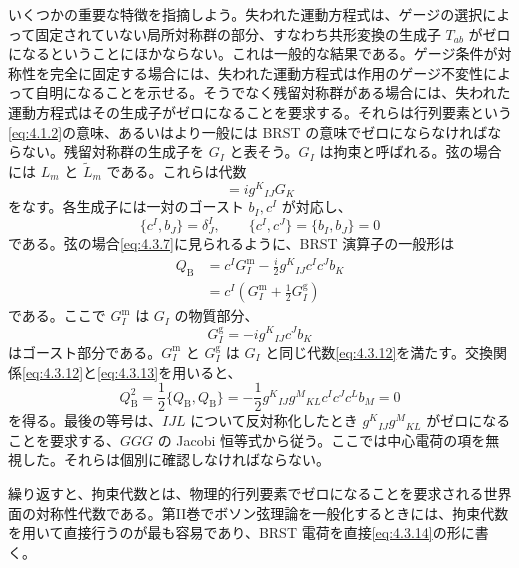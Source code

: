 いくつかの重要な特徴を指摘しよう。失われた運動方程式は、ゲージの選択によって固定されていない局所対称群の部分、すなわち共形変換の生成子 $T_{ab}$ がゼロになるということにほかならない。これは一般的な結果である。ゲージ条件が対称性を完全に固定する場合には、失われた運動方程式は作用のゲージ不変性によって自明になることを示せる。そうでなく残留対称群がある場合には、失われた運動方程式はその生成子がゼロになることを要求する。それらは行列要素という\eqref{eq:4.1.2}の意味、あるいはより一般には BRST の意味でゼロにならなければならない。残留対称群の生成子を $G_I$ と表そう。$G_I$ は拘束と呼ばれる。弦の場合には $L_m$ と $\widetilde L_m$ である。これらは代数
\begin{equation}
[G_I,G_J]=ig^K{}_{IJ}G_K
\tag{4.3.12}\label{eq:4.3.12}
\end{equation}
をなす。各生成子には一対のゴースト $b_I,c^I$ が対応し、
\begin{equation}
\{c^I,b_J\}=\delta^I_J,\qquad
\{c^I,c^J\}=\{b_I,b_J\}=0
\tag{4.3.13}\label{eq:4.3.13}
\end{equation}
である。弦の場合\eqref{eq:4.3.7}に見られるように、BRST 演算子の一般形は
\begin{equation}
\begin{aligned}
Q_{\mathrm B}
&=c^IG^{\mathrm m}_I-\frac i2g^K{}_{IJ}c^Ic^Jb_K\\
&=c^I\left(G^{\mathrm m}_I+\frac12G^{\mathrm g}_I\right)
\end{aligned}
\tag{4.3.14}\label{eq:4.3.14}
\end{equation}
である。ここで $G^{\mathrm m}_I$ は $G_I$ の物質部分、
\begin{equation}
G^{\mathrm g}_I=-ig^K{}_{IJ}c^Jb_K
\tag{4.3.15}\label{eq:4.3.15}
\end{equation}
はゴースト部分である。$G^{\mathrm m}_I$ と $G^{\mathrm g}_I$ は $G_I$ と同じ代数\eqref{eq:4.3.12}を満たす。交換関係\eqref{eq:4.3.12}と\eqref{eq:4.3.13}を用いると、
\begin{equation}
Q_{\mathrm B}^2=\frac12\{Q_{\mathrm B},Q_{\mathrm B}\}
=-\frac12g^K{}_{IJ}g^M{}_{KL}c^Ic^Jc^Lb_M=0
\tag{4.3.16}\label{eq:4.3.16}
\end{equation}
を得る。最後の等号は、$IJL$ について反対称化したとき $g^K{}_{IJ}g^M{}_{KL}$ がゼロになることを要求する、$GGG$ の Jacobi 恒等式から従う。ここでは中心電荷の項を無視した。それらは個別に確認しなければならない。

繰り返すと、拘束代数とは、物理的行列要素でゼロになることを要求される世界面の対称性代数である。第II巻でボソン弦理論を一般化するときには、拘束代数を用いて直接行うのが最も容易であり、BRST 電荷を直接\eqref{eq:4.3.14}の形に書く。

